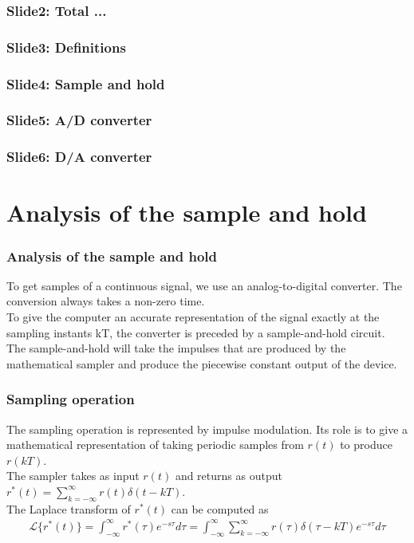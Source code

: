 \begin{frame}
	\frametitle{Slide2: Total ...}
	
\end{frame}

\begin{frame}
	\frametitle{Slide3: Definitions}
	
\end{frame}

\begin{frame}
	\frametitle{Slide4: Sample and hold}
	
\end{frame}

\begin{frame}
	\frametitle{Slide5: A/D converter}
	
\end{frame}

\begin{frame}
	\frametitle{Slide6: D/A converter}
	
\end{frame}

\section{Analysis of the sample and hold}

\begin{frame}
	\frametitle{Analysis of the sample and hold}
	\vspace{-6ex}
	To get samples of a continuous signal, we use an analog-to-digital converter. The conversion always takes a non-zero time.\\
	\medskip
	To give the computer an accurate representation of the signal exactly at the sampling instants kT, the converter is preceded by a sample-and-hold circuit.\\
	The sample-and-hold will take the impulses that are produced by the mathematical sampler and produce the piecewise constant output of the device.
\end{frame}

\begin{frame}
	\frametitle{Sampling operation}
	\vspace{-4ex}
	The sampling operation is represented by impulse modulation. Its role is to give a mathematical representation of taking periodic samples from $r(t)$ to produce $r(kT)$. \\
	\medskip
	The sampler takes as input $r(t)$ and returns as output
	\bigskip
	$r^*(t)=\sum_{k=-\infty}^{\infty} r(t)\delta(t-kT)$.\\
	The Laplace transform of $r^*(t)$ can be computed as\\
	\vspace{-2ex} 
	\begin{align*} 
	\mathcal{L}\{r^*(t)\} = \int_{-\infty}^{\infty} r^*(\tau)e^{-s\tau} d\tau = \int_{-\infty}^{\infty} \sum_{k=-\infty}^{\infty} r(\tau)\delta(\tau-kT)e^{-s\tau}d\tau 
	\end{align*}\\
\end{frame}

